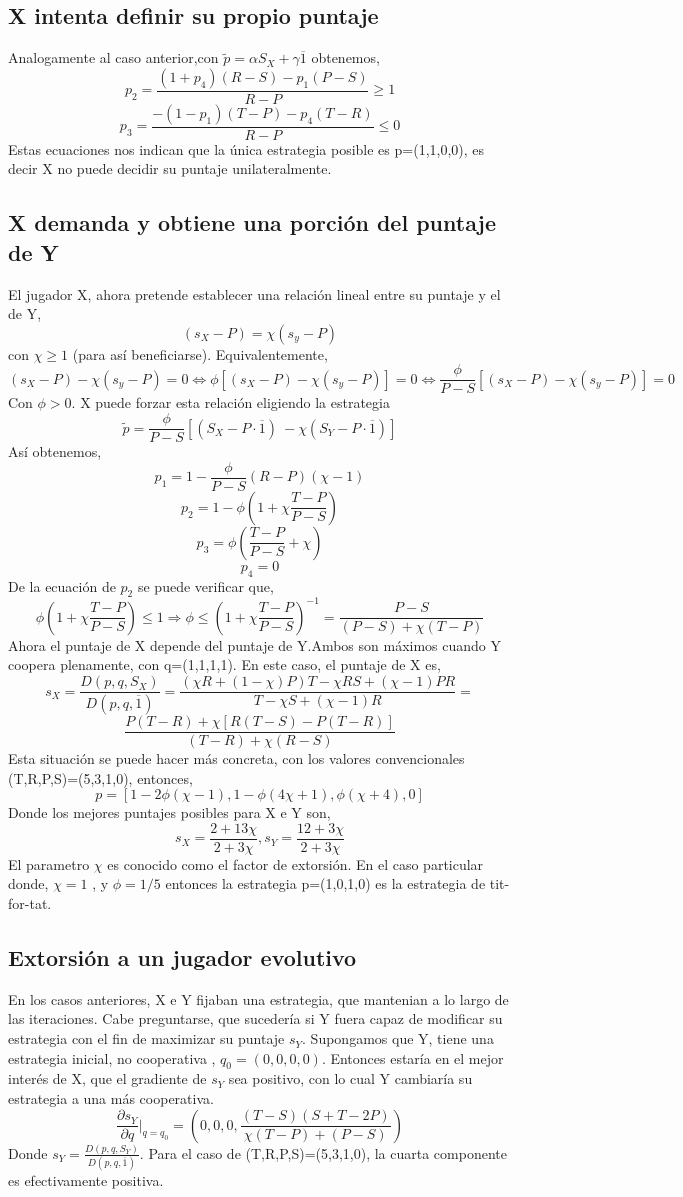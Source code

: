 \documentclass[12pt]{article}
\begin{document}
\subsection{X intenta definir su propio puntaje}
Analogamente al caso anterior,con $\tilde{p}=\alpha S_X + \gamma\overline1$  obtenemos,
$$p_2=\frac{(1+p_4)(R-S)-p_1(P-S)}{R-P}\geq 1$$
$$p_3=\frac{-(1-p_1)(T-P)-p_4(T-R)}{R-P}\leq 0$$
Estas ecuaciones nos indican que la única estrategia posible es p=(1,1,0,0), es decir
X no puede decidir su puntaje unilateralmente.


\subsection{X demanda y obtiene una porción del puntaje de Y}
El jugador X, ahora pretende establecer una relación lineal entre su puntaje y el de Y,
$$(s_X -P)=\chi (s_y-P)$$
con $\chi \geq 1$ (para así beneficiarse). Equivalentemente,
$$(s_X -P)-\chi (s_y-P)=0 \Leftrightarrow \phi[(s_X -P)-\chi (s_y-P)]=0 \Leftrightarrow \frac{\phi}{P-S}[(s_X -P)-\chi (s_y-P)]=0$$
Con $\phi>0$. X puede forzar esta relación eligiendo la estrategia
$$\tilde{p}=\frac{\phi}{P-S}[(S_X-P\cdot\overline1)\ - \chi (S_Y-P\cdot\overline1)]$$
Así obtenemos,
$$p_1=1-\frac{\phi}{P-S}(R-P)(\chi-1)$$
$$p_2=1-\phi(1+\chi \frac{T-P}{P-S})$$
$$p_3=\phi(\frac{T-P}{P-S}+\chi )$$
$$p_4=0$$
De la ecuación de $p_2$ se puede verificar que,
$$\phi(1+\chi\frac{T-P}{P-S})\leq 1 \Rightarrow \phi\leq(1+\chi \frac{T-P}{P-S})^{-1}=\frac{P-S}{(P-S) + \chi(T-P)}$$
Ahora el puntaje de X depende del puntaje de Y.Ambos son máximos cuando Y coopera plenamente, con
q=(1,1,1,1). En este caso, el puntaje de X es,
$$s_X= \frac{D(p,q,S_X)}{D(p,q,\overline1)}=\frac{(\chi R + (1-\chi)P)T-\chi RS+(\chi-1)PR}{T-\chi S+(\chi-1)R}=$$
$$\frac{P(T-R)+\chi[R(T-S)-P(T-R)]}{(T-R)+\chi(R-S)}$$
Esta situación se puede hacer más concreta, con los valores convencionales (T,R,P,S)=(5,3,1,0), entonces,
$$p=[1-2\phi(\chi-1),1-\phi(4 \chi+1),\phi(\chi+4),0]$$
Donde los mejores puntajes posibles para X e Y son,
$$s_X=\frac{2+13\chi}{2+3\chi}, s_Y=\frac{12+3\chi}{2+3\chi}$$
El parametro $\chi$ es conocido como el factor de extorsión. En el caso particular donde, $\chi=1$ , y $\phi =1/5$
entonces la estrategia p=(1,0,1,0) es la estrategia de tit-for-tat.

\subsection{Extorsión a un jugador evolutivo}
En los casos anteriores, X e Y fijaban una estrategia, que mantenian a lo largo de las iteraciones.
Cabe preguntarse, que sucedería si Y fuera capaz de modificar su estrategia con el fin de maximizar su
puntaje $s_Y$.
Supongamos que Y, tiene una estrategia inicial, no cooperativa  , $q_0=(0,0,0,0)$. 
Entonces estaría en el mejor interés de X, que el gradiente de $s_Y$ sea positivo, 
con lo cual Y cambiaría su estrategia a una más cooperativa.
$$\frac{\partial s_Y}{\partial q}|_{q=q_0}=(0,0,0,\frac{(T-S)(S+T-2P)}{\chi(T-P)+(P-S)})$$
Donde $s_Y=\frac{D(p,q,S_Y)}{D(p,q,\overline1)}$.
Para el caso de (T,R,P,S)=(5,3,1,0), la cuarta componente es efectivamente positiva.
\end{document}
